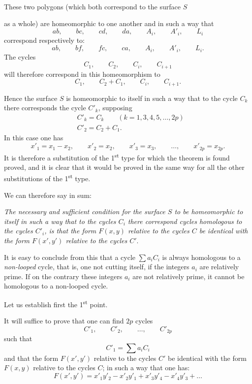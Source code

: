 \documentclass{article}
\begin{document}
These two polygons (which both correspond to the surface $S$

as a whole) are homeomorphic to one another and in such a way that
\[ ab, \qquad bc, \qquad cd, \qquad da, \qquad A_{i}, \qquad A'_{i}, \qquad L_{i} \]
correspond respectively to:
\[ ab, \qquad bf, \qquad fc, \qquad ca, \qquad A_{i}, \qquad A'_{i}, \qquad L_{i}. \]
The cycles
\[ C_{1}, \qquad C_{2}, \qquad C_{i}, \qquad C_{i+1} \]
will therefore correspond in this homeomorphism to
\[ C_{1}, \qquad C_{2} + C_{1}, \qquad C_{i}, \qquad C_{i+1}. \]

Hence the surface $S$ is homeomorphic to itself in such a way that to the cycle $C_{k}$ there corresponds the cycle $C'_{k}$, supposing
\[ \begin{aligned} &C'_{k} = C_{k} \qquad (k = 1, 3, 4, 5, \ldots, 2p)\\ &C'_{2} = C_{2} + C_{1}. \end{aligned} \]
In this case one has
\[ x'_{1} = x_{1} - x_{2}, \qquad x'_{2} = x_{2}, \qquad x'_{3} = x_{3}, \qquad \ldots, \qquad x'_{2p} = x_{2p}. \]
It is therefore a substitution of the 1\textsuperscript{st} type for which the theorem is found proved, and it is clear that it would be proved in the same way for all the other substitutions of the 1\textsuperscript{st} type.

We can therefore say in sum:

\emph{The necessary and sufficient condition for the surface $S$ to be homeomorphic to itself in such a way that to the cycles $C_{i}$ there correspond cycles homologous to the cycles $C'_{i}$, is that the form $F(x, y)$ relative to the cycles $C$ be identical with the form $F(x', y')$ relative to the cycles $C'$}.

It is easy to conclude from this that a cycle $\displaystyle\sum a_{i} C_{i}$ is always homologous to a \emph{non-looped} cycle, that is, one not cutting itself, if the integers $a_{i}$ are relatively prime. If on the contrary these integers $a_{i}$ are not relatively prime, it cannot be homologous to a non-looped cycle.

Let us establish first the 1\textsuperscript{st} point.

It will suffice to prove that one can find $2p$ cycles
\[ C'_{1}, \qquad C'_{2}, \qquad \ldots, \qquad C'_{2p} \]
such that
\[ C'_{1} = \sum a_{i} C_{i} \]
and that the form $F(x', y')$ relative to the cycles $C'$ be identical with the form $F(x, y)$ relative to the cycles $C$; in such a way that one has:
\[ F(x', y') = x'_{1}y'_{2} - x'_{2}y'_{1} + x'_{3}y'_{4} - x'_{4}y'_{3} + \ldots \]
\end{document}
